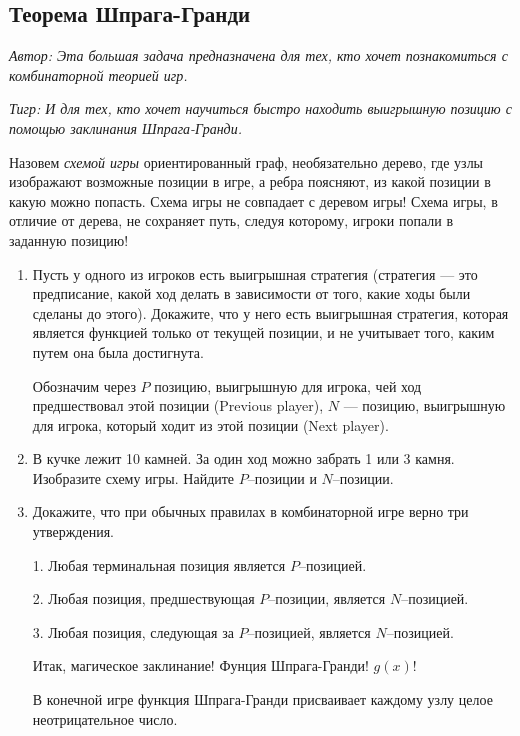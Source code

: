 \subsection{Теорема Шпрага-Гранди}

\begin{problem}

{\it Автор: Эта большая задача предназначена для тех, кто хочет познакомиться с комбинаторной теорией игр. }\par
{\it Тигр: И для тех, кто хочет научиться быстро находить выигрышную позицию с помощью заклинания Шпрага-Гранди.}\par
Назовем {\it схемой игры} ориентированный граф, необязательно дерево, где узлы изображают возможные позиции в игре, а ребра поясняют, из какой позиции в какую можно попасть. Схема игры не совпадает с деревом игры! Схема игры, в отличие от дерева, не сохраняет путь, следуя которому, игроки попали в заданную позицию!
\begin{enumerate}
\item 	Пусть у одного из игроков есть выигрышная стратегия (стратегия --- это предписание, какой ход делать в зависимости от того, какие ходы были сделаны до этого). Докажите, что у него есть выигрышная стратегия, которая является функцией только от текущей позиции, и не учитывает того, каким путем она была достигнута. \par
Обозначим через $P$ позицию, выигрышную для игрока, чей ход предшествовал этой позиции (Previous player), $N$ --- позицию, выигрышную для игрока, который ходит из этой позиции (Next player).\par
\item\label{p:ShG2}	В кучке лежит 10 камней. За один ход можно забрать 1 или 3 камня. Изобразите схему игры. Найдите  $P$--позиции и  $N$--позиции.\par
\item \label{p:ShG3}	Докажите, что при обычных правилах в комбинаторной игре верно три утверждения. \par
1. Любая терминальная позиция является  $P$--позицией. \par
2. Любая позиция, предшествующая  $P$--позиции, является  $N$--позицией. \par
3. Любая позиция, следующая за  $P$--позицией, является  $N$--позицией.\par
Итак, магическое заклинание! Фунция Шпрага-Гранди!  $g\left(x\right)$!\par
В конечной игре функция Шпрага-Гранди присваивает каждому узлу целое неотрицательное число.

\end{enumerate}
\end{problem}
